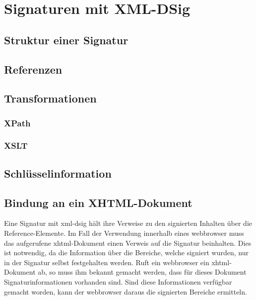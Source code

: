 
\chapter{Signaturen mit XML-DSig}
\label{chap:SignaturenXMLDSig}

\section{Struktur einer Signatur}

\section{Referenzen}
\label{sec:Signaturbindung:Referenzen}

\section{Transformationen}
\label{sec:Signaturbindung:Transformationen}

\subsection{XPath}
\label{sec:Signaturbindung:Transformationen:XPath}

\subsection{XSLT}
\label{sec:Signaturbindung:Transformationen:XSLT}

\section{Schlüsselinformation}

\section{Bindung an ein XHTML-Dokument}
Eine Signatur mit \gls{xml-dsig} hält ihre Verweise zu den signierten Inhalten über die Reference-Elemente. Im Fall der Verwendung innerhalb eines
\gls{webbrowser} muss das aufgerufene \gls{xhtml}-Dokument einen Verweis auf die Signatur beinhalten. Dies ist notwendig, da die Information über die Bereiche,
welche signiert wurden, nur in der Signatur selbst festgehalten werden. Ruft ein \gls{webbrowser} ein \gls{xhtml}-Dokument ab, so muss ihm bekannt gemacht
werden, dass für dieses Dokument Signaturinformationen vorhanden sind. Sind diese Informationen verfügbar gemacht worden, kann der \gls{webbrowser} daraus die
signierten Bereiche ermitteln.\\

